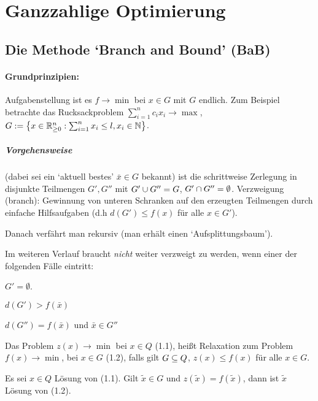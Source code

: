 \section{Ganzzahlige Optimierung}

\subsection{Die Methode `Branch and Bound' (BaB)}

\paragraph{Grundprinzipien:}

Aufgabenstellung ist es $f\to \min$ bei $x\in G$ mit $G$ endlich. Zum Beispiel betrachte das Rucksackproblem $\sum_{i=1}^n{c_ix_i}\to\max$, $G:=\set{x\in\reals^n_{\geq 0}:\sum_{i=1}^n{x_i}\leq l, x_i\in\nats}$.

\subparagraph{Vorgehensweise} (dabei sei ein `aktuell bestes' $\bar x\in G$ bekannt) ist die schrittweise Zerlegung in disjunkte Teilmengen $G',G''$ mit $G'\cup G''=G$, $G'\cap G''=\emptyset$.
Verzweigung (branch): Gewinnung von unteren Schranken auf den erzeugten Teilmengen durch einfache Hilfsaufgaben (d.h $d(G')\leq f(x)$ für alle $x\in G'$).

Danach verfährt man rekursiv (man erhält einen `Aufsplittungsbaum').

Im weiteren Verlauf braucht \emph{nicht} weiter verzweigt zu werden, wenn einer der folgenden Fälle eintritt:
\begin{casebycase}
        \item $G'=\emptyset$.
        \item $d(G')>f(\bar x)$
        \item $d (G'')=f(\bar x)$ und $\bar x\in G''$
\end{casebycase}

\begin{definition}
    Das Problem $z(x)\to\min$ bei $x\in Q$ (1.1), heißt Relaxation zum Problem
    $f(x)\to\min$, bei $x\in G$ (1.2), falls gilt $G\subseteq Q$, $z(x)\leq f(x)$ für alle $x\in G$.
\end{definition}

\begin{lemma}
    Es sei $\hat x\in Q$ Lösung von (1.1). Gilt $\tilde x\in G$ und $z(\tilde x)=f(\tilde x)$, dann ist $\tilde x$ Lösung von (1.2).
\end{lemma}

